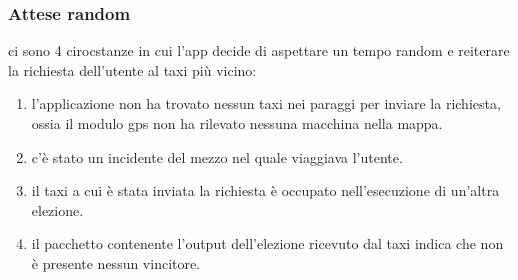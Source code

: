 \subsubsection{Attese random}
ci sono 4 cirocstanze in cui l'app decide di aspettare un tempo random e reiterare la richiesta dell'utente al taxi più vicino:
\begin{enumerate}
	\item l'applicazione non ha trovato nessun taxi nei paraggi per inviare la richiesta, ossia il modulo gps non ha rilevato nessuna macchina nella mappa.
	\item c'è stato un incidente del mezzo nel quale viaggiava l'utente.
	\item il taxi a cui è stata inviata la richiesta è occupato nell'esecuzione di un'altra elezione.
	\item il pacchetto contenente l'output dell'elezione ricevuto dal taxi indica che non è presente nessun vincitore.
\end{enumerate}





